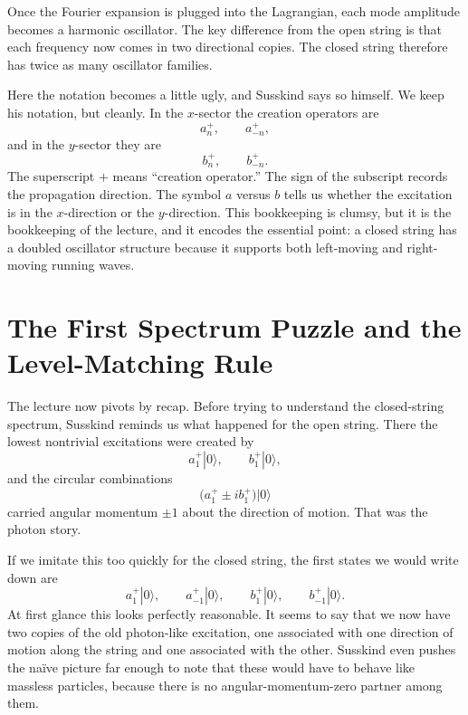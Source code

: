 Once the Fourier expansion is plugged into the Lagrangian, each mode amplitude becomes a harmonic oscillator. The key difference from the open string is that each frequency now comes in two directional copies. The closed string therefore has twice as many oscillator families.

Here the notation becomes a little ugly, and Susskind says so himself. We keep his notation, but cleanly. In the \(x\)-sector the creation operators are
\begin{equation}
a_n^+,\qquad a_{-n}^+,
\end{equation}
and in the \(y\)-sector they are
\begin{equation}
b_n^+,\qquad b_{-n}^+.
\end{equation}
The superscript \(+\) means ``creation operator.'' The sign of the subscript records the propagation direction. The symbol \(a\) versus \(b\) tells us whether the excitation is in the \(x\)-direction or the \(y\)-direction. This bookkeeping is clumsy, but it is the bookkeeping of the lecture, and it encodes the essential point: a closed string has a doubled oscillator structure because it supports both left-moving and right-moving running waves.

\section{The First Spectrum Puzzle and the Level-Matching Rule}

The lecture now pivots by recap. Before trying to understand the closed-string spectrum, Susskind reminds us what happened for the open string. There the lowest nontrivial excitations were created by
\begin{equation}
a_1^+|0\rangle,
\qquad
b_1^+|0\rangle,
\end{equation}
and the circular combinations
\begin{equation}
\big(a_1^+\pm i b_1^+\big)|0\rangle
\end{equation}
carried angular momentum \(\pm1\) about the direction of motion. That was the photon story.

If we imitate this too quickly for the closed string, the first states we would write down are
\begin{equation}
a_1^+|0\rangle,\qquad
a_{-1}^+|0\rangle,\qquad
b_1^+|0\rangle,\qquad
b_{-1}^+|0\rangle.
\end{equation}
At first glance this looks perfectly reasonable. It seems to say that we now have two copies of the old photon-like excitation, one associated with one direction of motion along the string and one associated with the other. Susskind even pushes the naïve picture far enough to note that these would have to behave like massless particles, because there is no angular-momentum-zero partner among them.

